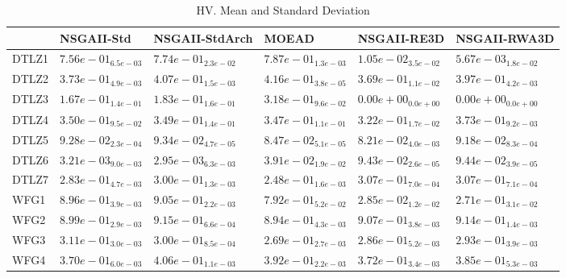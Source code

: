 \documentclass{article}
\begin{document}
\begin{table}
\caption{HV. Mean and Standard Deviation}
\label{table: HV}
\centering
\begin{scriptsize}
\begin{tabular}{llllll}
\hline & NSGAII-Std & NSGAII-StdArch & MOEAD & NSGAII-RE3D &  NSGAII-RWA3D\\
\hline 
DTLZ1 & $  7.56e-01_{ 6.5e-03}$ & \cellcolor{gray25}$  7.74e-01_{ 2.3e-02}$ & \cellcolor{gray95}$  7.87e-01_{ 1.3e-03}$ & $  1.05e-02_{ 3.5e-02}$ & $  5.67e-03_{ 1.8e-02}$ \\
DTLZ2 & $  3.73e-01_{ 4.9e-03}$ & \cellcolor{gray25}$  4.07e-01_{ 1.5e-03}$ & \cellcolor{gray95}$  4.16e-01_{ 3.8e-05}$ & $  3.69e-01_{ 1.1e-02}$ & $  3.97e-01_{ 4.2e-03}$ \\
DTLZ3 & $  1.67e-01_{ 1.4e-01}$ & \cellcolor{gray25}$  1.83e-01_{ 1.6e-01}$ & \cellcolor{gray95}$  3.18e-01_{ 9.6e-02}$ & $  0.00e+00_{ 0.0e+00}$ & $  0.00e+00_{ 0.0e+00}$ \\
DTLZ4 & \cellcolor{gray25}$  3.50e-01_{ 9.5e-02}$ & $  3.49e-01_{ 1.4e-01}$ & $  3.47e-01_{ 1.1e-01}$ & $  3.22e-01_{ 1.7e-02}$ & \cellcolor{gray95}$  3.73e-01_{ 9.2e-03}$ \\
DTLZ5 & \cellcolor{gray25}$  9.28e-02_{ 2.3e-04}$ & \cellcolor{gray95}$  9.34e-02_{ 4.7e-05}$ & $  8.47e-02_{ 5.1e-05}$ & $  8.21e-02_{ 4.0e-03}$ & $  9.18e-02_{ 8.3e-04}$ \\
DTLZ6 & $  3.21e-03_{ 9.0e-03}$ & $  2.95e-03_{ 6.3e-03}$ & $  3.91e-02_{ 1.9e-02}$ & \cellcolor{gray25}$  9.43e-02_{ 2.6e-05}$ & \cellcolor{gray95}$  9.44e-02_{ 3.9e-05}$ \\
DTLZ7 & $  2.83e-01_{ 4.7e-03}$ & $  3.00e-01_{ 1.3e-03}$ & $  2.48e-01_{ 1.6e-03}$ & \cellcolor{gray95}$  3.07e-01_{ 7.0e-04}$ & \cellcolor{gray25}$  3.07e-01_{ 7.1e-04}$ \\
WFG1 & \cellcolor{gray25}$  8.96e-01_{ 3.9e-03}$ & \cellcolor{gray95}$  9.05e-01_{ 2.2e-03}$ & $  7.92e-01_{ 5.2e-02}$ & $  2.85e-02_{ 1.2e-02}$ & $  2.71e-01_{ 3.1e-02}$ \\
WFG2 & $  8.99e-01_{ 2.9e-03}$ & \cellcolor{gray95}$  9.15e-01_{ 6.6e-04}$ & $  8.94e-01_{ 4.3e-03}$ & $  9.07e-01_{ 3.8e-03}$ & \cellcolor{gray25}$  9.14e-01_{ 1.4e-03}$ \\
WFG3 & \cellcolor{gray95}$  3.11e-01_{ 3.0e-03}$ & \cellcolor{gray25}$  3.00e-01_{ 8.5e-04}$ & $  2.69e-01_{ 2.7e-03}$ & $  2.86e-01_{ 5.2e-03}$ & $  2.93e-01_{ 3.9e-03}$ \\
WFG4 & $  3.70e-01_{ 6.0e-03}$ & \cellcolor{gray95}$  4.06e-01_{ 1.1e-03}$ & \cellcolor{gray25}$  3.92e-01_{ 2.2e-03}$ & $  3.72e-01_{ 3.4e-03}$ & $  3.85e-01_{ 5.3e-03}$ \\

\end{tabular}
\end{scriptsize}
\end{table}
\end{document}
